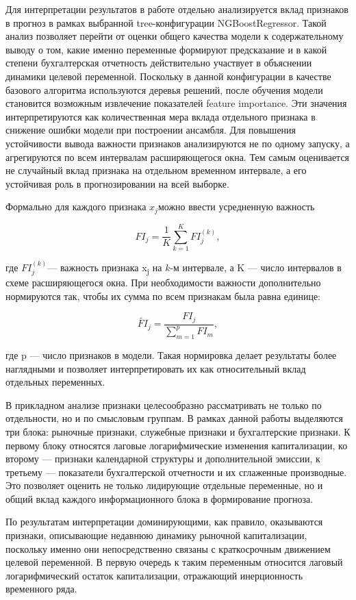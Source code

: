 \documentclass[
]{article}
\begin{document}
Для интерпретации результатов в работе отдельно анализируется вклад признаков в прогноз в рамках выбранной tree-конфигурации NGBoostRegressor. Такой анализ позволяет перейти от оценки общего качества модели к содержательному выводу о том, какие именно переменные формируют предсказание и в какой степени бухгалтерская отчетность действительно участвует в объяснении динамики целевой переменной. Поскольку в данной конфигурации в качестве базового алгоритма используются деревья решений, после обучения модели становится возможным извлечение показателей feature importance. Эти значения интерпретируются как количественная мера вклада отдельного признака в снижение ошибки модели при построении ансамбля. Для повышения устойчивости вывода важности признаков анализируются не по одному запуску, а агрегируются по всем интервалам расширяющегося окна. Тем самым оценивается не случайный вклад признака на отдельном временном интервале, а его устойчивая роль в прогнозировании на всей выборке.

Формально для каждого признака \(x_{j}\)можно ввести усредненную важность

\[FI_{j} = \frac{1}{K}\sum_{k = 1}^{K}FI_{j}^{(k)},\]

где \(FI_{j}^{(k)}\)--- важность признака x\textsubscript{j} на \(k\)-м интервале, а K --- число интервалов в схеме расширяющегося окна. При необходимости важности дополнительно нормируются так, чтобы их сумма по всем признакам была равна единице:

\[{\widetilde{FI}}_{j} = \frac{FI_{j}}{\sum_{m = 1}^{p}FI_{m}},\]

где p --- число признаков в модели. Такая нормировка делает результаты более наглядными и позволяет интерпретировать их как относительный вклад отдельных переменных.

В прикладном анализе признаки целесообразно рассматривать не только по отдельности, но и по смысловым группам. В рамках данной работы выделяются три блока: рыночные признаки, служебные признаки и бухгалтерские признаки. К первому блоку относятся лаговые логарифмические изменения капитализации, ко второму --- признаки календарной структуры и дополнительной эмиссии, к третьему --- показатели бухгалтерской отчетности и их сглаженные производные. Это позволяет оценить не только лидирующие отдельные переменные, но и общий вклад каждого информационного блока в формирование прогноза.

По результатам интерпретации доминирующими, как правило, оказываются признаки, описывающие недавнюю динамику рыночной капитализации, поскольку именно они непосредственно связаны с краткосрочным движением целевой переменной. В первую очередь к таким переменным относится лаговый логарифмический остаток капитализации, отражающий инерционность временного ряда.
\end{document}
